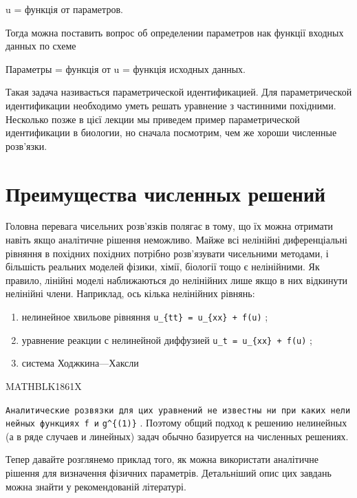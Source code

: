 \documentclass[
  ukrainian,
]{article}
\begin{document}
u = функція от параметров.

Тогда можна поставить вопрос об определении параметров нак функції
входных данных по схеме

Параметры = функція от u = функція исходных данных.

Такая задача називається параметрической идентификацией. Для
параметрической идентификации необходимо уметь решать уравнение з
частинними похідними. Несколько позже в цієї лекции мы приведем пример
параметрической идентификации в биологии, но сначала посмотрим, чем же
хороши численные розв'язки.

\section{Преимущества численных
решений}\label{ux43fux440ux435ux438ux43cux443ux449ux435ux441ux442ux432ux430-ux447ux438ux441ux43bux435ux43dux43dux44bux445-ux440ux435ux448ux435ux43dux438ux439}

Головна перевага чисельних розв'язків полягає в тому, що їх можна
отримати навіть якщо аналітичне рішення неможливо. Майже всі нелінійні
диференціальні рівняння в похідних похідних потрібно розв'язувати
чисельними методами, і більшість реальних моделей фізики, хімії,
біології тощо є нелінійними. Як правило, лінійні моделі наближаються до
нелінійних лише якщо в них відкинути нелінійні члени. Наприклад, ось
кілька нелінійних рівнянь:

\begin{enumerate}
\def\labelenumi{\arabic{enumi})}
\item
  нелинейное хвильове рівняння \texttt{u\_\{tt\}\ =\ u\_\{xx\}\ +\ f(u)}
  ;
\item
  уравнение реакции с нелинейной диффузией
  \texttt{u\_t\ =\ u\_\{xx\}\ +\ f(u)} ;
\item
  система Ходжкина---Хаксли
\end{enumerate}

MATHBLK1861X

\texttt{Аналитические\ розв\textquotesingle{}язки\ для\ цих\ уравнений\ не\ известны\ ни\ при\ каких\ нелинейных\ функциях\ f\ и}
\texttt{g\^{}\{(1)\}} . Поэтому общий подход к решению нелинейных (а в
ряде случаев и линейных) задач обычно базируется на численных решениях.

Тепер давайте розглянемо приклад того, як можна використати аналітичне
рішення для визначення фізичних параметрів. Детальніший опис цих завдань
можна знайти у рекомендованій літературі.
\end{document}
